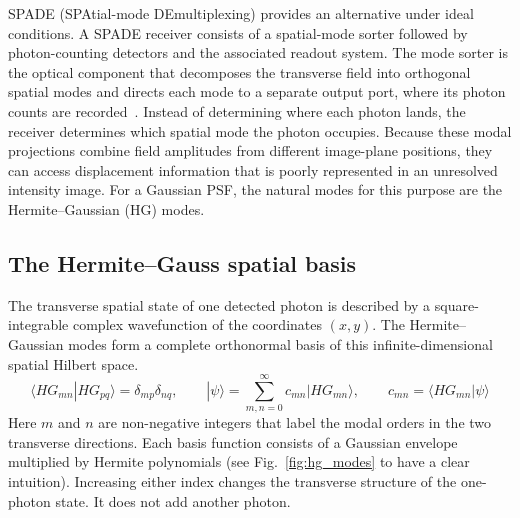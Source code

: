 SPADE (SPAtial-mode DEmultiplexing) provides an alternative under ideal conditions. A SPADE receiver consists of a spatial-mode sorter followed by photon-counting detectors and the associated readout system. The mode sorter is the optical component that decomposes the transverse field into orthogonal spatial modes and directs each mode to a separate output port, where its photon counts are recorded~\cite{Tsang2016quantum,Santamaria2024single}. Instead of determining where each photon lands, the receiver determines which spatial mode the photon occupies. Because these modal projections combine field amplitudes from different image-plane positions, they can access displacement information that is poorly represented in an unresolved intensity image. For a Gaussian PSF, the natural modes for this purpose are the Hermite--Gaussian (HG) modes.

\subsection{The Hermite--Gauss spatial basis}

\begin{definition}
    The transverse spatial state of one detected photon is described by a square-integrable complex wavefunction of the coordinates $(x,y)$. The Hermite--Gaussian modes form a complete orthonormal basis of this infinite-dimensional spatial Hilbert space.
    \begin{equation}
        \langle HG_{mn}|HG_{pq}\rangle=\delta_{mp}\delta_{nq},
        \qquad
        |\psi\rangle=\sum_{m,n=0}^{\infty}c_{mn}|HG_{mn}\rangle,
        \qquad
        c_{mn}=\langle HG_{mn}|\psi\rangle
        \label{eq:hg_complete_basis}
    \end{equation}
    Here $m$ and $n$ are non-negative integers that label the modal orders in the two transverse directions.  Each basis function consists of a Gaussian envelope multiplied by Hermite polynomials (see Fig.~\ref{fig:hg_modes} to have a clear intuition).  Increasing either index changes the transverse structure of the one-photon state. It does not add another photon.
\end{definition}

